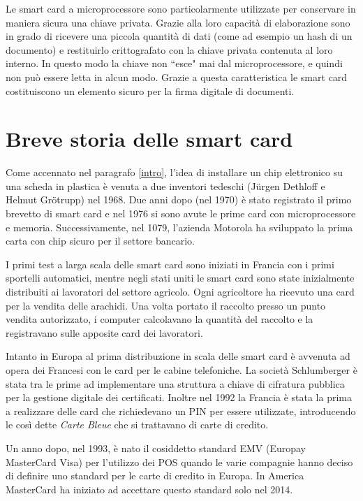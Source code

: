 Le smart card a microprocessore sono particolarmente utilizzate per conservare in maniera sicura una chiave privata. Grazie alla loro capacità di elaborazione sono in grado di ricevere una piccola quantità di dati (come ad esempio un hash di un documento) e restituirlo crittografato con la chiave privata contenuta al loro interno. In questo modo la chiave non ``esce" mai dal microprocessore, e quindi non può essere letta in alcun modo. Grazie a questa caratteristica le smart card costituiscono un elemento sicuro per la firma digitale di documenti.
\cite{wiki_sc}

\section{Breve storia delle smart card}
Come accennato nel paragrafo \ref{intro}, l'idea di installare un chip elettronico su una scheda in plastica è venuta a due inventori tedeschi (Jürgen Dethloff e Helmut Grötrupp) nel 1968. Due anni dopo (nel 1970) è stato registrato il primo brevetto di smart card e nel 1976 si sono avute le prime card con microprocessore e memoria. Successivamente, nel 1079, l'azienda Motorola ha sviluppato la prima carta con chip sicuro per il settore bancario.

I primi test a larga scala delle smart card sono iniziati in Francia con i primi sportelli automatici, mentre negli stati uniti le smart card sono state inizialmente distribuiti ai lavoratori del settore agricolo. Ogni agricoltore ha ricevuto una card per la vendita delle arachidi. Una volta portato il raccolto presso un punto vendita autorizzato, i computer calcolavano la quantità del raccolto e la registravano sulle apposite card dei lavoratori.

Intanto in Europa al prima distribuzione in scala delle smart card è avvenuta ad opera dei Francesi con le card per le cabine telefoniche. La società Schlumberger è stata tra le prime ad implementare una struttura a chiave di cifratura pubblica per la gestione digitale dei certificati. Inoltre nel 1992 la Francia è stata la prima a realizzare delle card che richiedevano un PIN per essere utilizzate, introducendo le così dette  \textit{Carte Bleue} che si trattavano di carte di credito.

Un anno dopo, nel 1993, è nato il cosiddetto standard EMV (Europay MasterCard Visa) per l'utilizzo dei POS quando le varie compagnie hanno deciso di definire uno standard per le carte di credito in Europa. In America MasterCard ha iniziato ad accettare questo standard solo nel 2014.
\cite{history}

